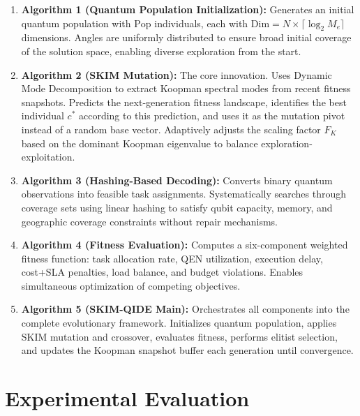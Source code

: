 \documentclass[10pt,twocolumn]{article}
\begin{document}
\begin{enumerate}[leftmargin=*,itemsep=2pt]
  \item \textbf{Algorithm 1 (Quantum Population Initialization):} Generates an initial quantum population with $\mathrm{Pop}$ individuals, each with $\mathrm{Dim}=N\times\lceil\log_2 M_e\rceil$ dimensions. Angles are uniformly distributed to ensure broad initial coverage of the solution space, enabling diverse exploration from the start.
  
  \item \textbf{Algorithm 2 (SKIM Mutation):} The core innovation. Uses Dynamic Mode Decomposition to extract Koopman spectral modes from recent fitness snapshots. Predicts the next-generation fitness landscape, identifies the best individual $c^*$ according to this prediction, and uses it as the mutation pivot instead of a random base vector. Adaptively adjusts the scaling factor $F_K$ based on the dominant Koopman eigenvalue to balance exploration-exploitation.
  
  \item \textbf{Algorithm 3 (Hashing-Based Decoding):} Converts binary quantum observations into feasible task assignments. Systematically searches through coverage sets using linear hashing to satisfy qubit capacity, memory, and geographic coverage constraints without repair mechanisms.
  
  \item \textbf{Algorithm 4 (Fitness Evaluation):} Computes a six-component weighted fitness function: task allocation rate, QEN utilization, execution delay, cost+SLA penalties, load balance, and budget violations. Enables simultaneous optimization of competing objectives.
  
  \item \textbf{Algorithm 5 (SKIM-QIDE Main):} Orchestrates all components into the complete evolutionary framework. Initializes quantum population, applies SKIM mutation and crossover, evaluates fitness, performs elitist selection, and updates the Koopman snapshot buffer each generation until convergence.
\end{enumerate}

\section{Experimental Evaluation}
\end{document}

